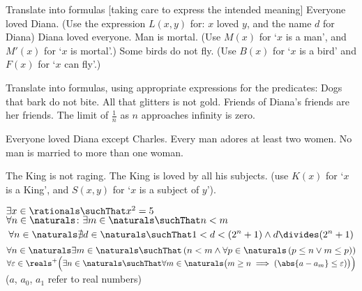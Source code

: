 \begin{Exercise} [number=32]
  Translate into formulas [taking care to express the intended meaning]
  \Question Everyone loved Diana. (Use the expression $L(x,y)$ for: $x$ loved $y$, and the name $d$ for Diana)
  \Question Diana loved everyone.
  \Question Man is mortal. (Use $M(x)$ for `$x$ is a man', and $M\prime(x)$ for `$x$ is mortal'.)
  \Question Some birds do not fly. (Use $B(x)$ for `$x$ is a bird' and $F(x)$ for `$x$ can fly'.)
\end{Exercise}

\begin{Exercise} [number=33]
  Translate into formulas, using appropriate expressions for the predicates:
  \Question Dogs that bark do not bite.
  \Question All that glitters is not gold.
  \Question Friends of Diana's friends are her friends.
  \Question The limit of $\frac{1}{n}$ as $n$ approaches infinity is zero.
\end{Exercise}

\begin{Exercise} [number=34]
  \Question Everyone loved Diana except Charles.
  \Question Every man adores at least two women.
  \Question No man is married to more than one woman.
\end{Exercise}

\begin{Exercise} [number=35]
  \Question The King is not raging.
  \Question The King is loved by all his subjects. (use $K(x)$ for `$x$ is a King', and $S(x,y)$ for `$x$ is a subject of $y$').
\end{Exercise}

\begin{Exercise} [number=36]
  \Question $\exists{x} \in \rationals \suchThat x^2 = 5$
  \Question $\forall{n} \in \naturals \colon \exists{m} \in \naturals \suchThat n < m$
  \Question \[\forall{n} \in \naturals 
              \nexists{d} \in \naturals \suchThat 
                 1 < d < (2^n + 1) \land d \divides (2^n + 1)
            \]
  \Question $\forall{n} \in \naturals \exists{m} \in \naturals \suchThat \left( n < m \land \forall{p} \in \naturals \left(p \leq n \lor m \leq p \right)\right)$
  \Question $\forall{\varepsilon} \in \reals^{+} 
             \Bigl(
                \exists{n} \in \naturals \suchThat
                    \forall{m} \in \naturals
                    \bigl( 
                        m \geq n \implies 
                        \left(
                            \abs{a - a_m} \leq \varepsilon 
                        \right) 
                    \bigr) 
             \Bigr)$
            ($a$, $a_0$, $a_1$ refer to real numbers)
\end{Exercise}
  
